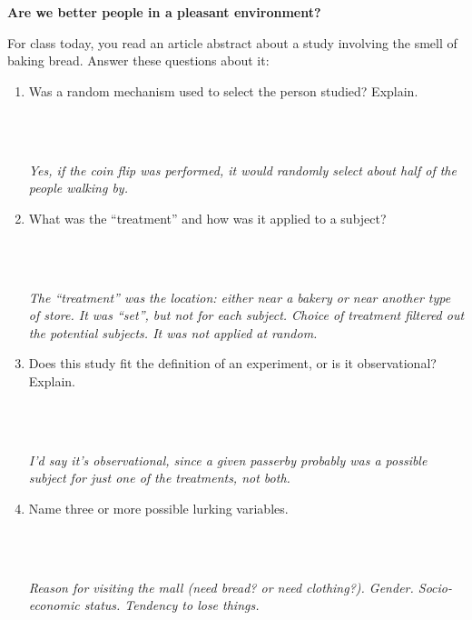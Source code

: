 \begin{center}
\vspace*{.1in}
{\bf {\large Are we better people in a pleasant environment?}}
\end{center}
\vspace{-.1in}

For class today, you read an article abstract about a study involving
the smell of baking bread.  Answer these questions about it:


 \begin{enumerate}
   \item  Was a random mechanism used to select the person studied?
     Explain. 
\begin{students}
 \vspace{1cm}\\
\end{students}
\begin{key}
\\ {\it Yes, if the coin flip was performed, it would randomly select
  about half of the people walking by. }
\end{key}
   \item  What was the “treatment” and how was it applied to a
     subject? 
\begin{students}
 \vspace{1cm}\\
\end{students}
\begin{key}
 \\{\it The ``treatment'' was the location: either near a bakery or
   near another type of store. It was ``set'', but not for each
   subject. Choice of treatment filtered out the potential subjects.
   It was not applied at random.}
\end{key}
   \item  Does this study fit the definition of an experiment, or is
     it observational? Explain. 
\begin{students}
 \vspace{1cm}\\
\end{students}
\begin{key}
 \\ {\it I'd say it's observational, since a given passerby probably
   was a possible subject for just one of the treatments, not both.}
\end{key}
   \item  Name three or more possible lurking variables. 
\begin{students}
 \vspace{1cm}\\
\end{students}
\begin{key}
 \\ {\it Reason for visiting the mall (need bread? or need
   clothing?).  Gender. Socio-economic status. Tendency to lose things.}


\end{key}
\end{enumerate}
